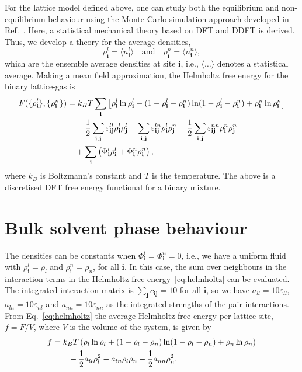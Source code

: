 \documentclass[journal=langd5,manuscript=article]{achemso}
\def\i{\mathbf{i}}
\def\j{\mathbf{j}}
\def\e{\varepsilon}
\begin{document}
For the lattice model defined above, one can study both the equilibrium
and non-equilibrium behaviour using the Monte-Carlo simulation approach
developed in {Ref.}~. Here, a statistical mechanical
theory based on DFT \cite{Evans79, Evans92, hansen} and
DDFT \cite{MaTa99, MaTa00, ArEv04, ArRa04} is derived. Thus,
we develop a theory for the average densities,
%
\begin{equation}
  \rho^l_\i = \langle n^l_\i \rangle \quad \text{and} \quad
  \rho^n_\i = \langle n^n_\i \rangle,
\end{equation}
%
which are the ensemble average densities at site $\i$, i.e.,
$\langle\ldots\rangle$ denotes a statistical average. Making a mean
field approximation, the Helmholtz free energy for the binary
lattice-gas is \cite{hughes2014, woywod03, woywod04, woywod06, hughes2015}
%
\begin{align}
F(\{\rho^l_\i\},\{\rho^n_\i\})%
  &= k_B T \sum_\i \left[
    \rho^l_\i \ln \rho^l_\i
    - (1 - \rho^l_\i - \rho^n_\i) \ln (1 - \rho^l_\i - \rho^n_\i)
    + \rho^n_\i \ln \rho^n_\i
  \right]
  \notag\\
  &\quad
    - \frac12 \sum_{\i,\j} \e^{ll}_{\i\j} \rho^l_\i \rho^l_\j
    - \sum_{\i,\j} \e^{ln}_{\i\j} \rho^l_\i \rho^n_\j
    - \frac12 \sum_{\i,\j} \e^{nn}_{\i\j} \rho^n_\i \rho^n_\j
  \notag\\
  &\quad
    + \sum_\i \left(
        \Phi^l_\i \rho^l_\i
      + \Phi^n_\i \rho^n_\i
    \right),
\label{eq:helmholtz}
\end{align}
%
where $k_B$ is Boltzmann's constant and $T$ is the temperature. The above is a discretised DFT {free energy functional} for a binary mixture.


\section{Bulk solvent phase behaviour}\label{bulk-phase}

The densities can be constants when $\Phi^l_\i = \Phi^n_\i = 0$, i.e., we
have a uniform fluid with $\rho^l_\i = \rho_l$ and $\rho^n_\i = \rho_n$, for
all $\i$. In this case, the sum over neighbours in the interaction terms in
the Helmholtz free energy~\eqref{eq:helmholtz} can be evaluated. The
integrated interaction matrix is $\sum_\j c_{\i\j} = 10$ for all $\i$, so we
have $a_{ll} = 10\e_{ll}$, $a_{ln}=10\e_{nl}$ and $a_{nn}=10\e_{nn}$ as
the integrated strengths of the pair interactions. From
Eq.~\eqref{eq:helmholtz} the average Helmholtz free energy per lattice
site, $f = F/V$, where $V$ is the volume of the system, is given by
%
\begin{align}
  f &=
  k_BT \left(
     \rho_l \ln \rho_l
     + (1 - \rho_l - \rho_n) \ln (1 - \rho_l - \rho_n)
     + \rho_n \ln \rho_n
   \right)
\notag\\
   &\qquad - \frac12 a_{ll} \rho_l^2
   - a_{ln} \rho_l \rho_n
   - \frac12 a_{nn} \rho_n^2.
\label{eq:area-energy}
\end{align}
\end{document}
